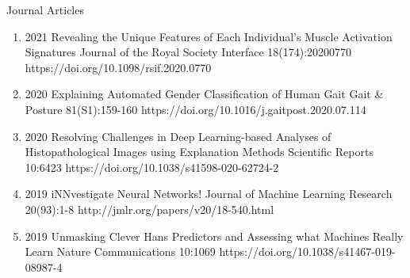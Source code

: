\documentclass[10pt,a4paper]{article} %
\begin{document}
\headedsection %
{Journal Articles}{ }
{
\begin{enumerate}

    \item[] 
                        {2021}
                        {Revealing the Unique Features of Each Individual's Muscle Activation Signatures}
                        {Journal of the Royal Society Interface}
                        {18(174):20200770}
                        {https://doi.org/10.1098/rsif.2020.0770}

    \item[] 
                        {2020}
                        {Explaining Automated Gender Classification of Human Gait}
                        {Gait \& Posture}
                        {81(S1):159-160}
                        {https://doi.org/10.1016/j.gaitpost.2020.07.114}

    \item[] 
                        {2020}
                        {Resolving Challenges in Deep Learning-based Analyses of Histopathological Images using Explanation Methods}
                        {Scientific Reports}
                        {10:6423}
                        {https://doi.org/10.1038/s41598-020-62724-2}

    \item[] 
                        {2019}
                        {iNNvestigate Neural Networks!}
                        {Journal of Machine Learning Research}
                        {20(93):1-8}
                        {http://jmlr.org/papers/v20/18-540.html}

    \item[] 
                        {2019}
                        {Unmasking Clever Hans Predictors and Assessing what Machines Really Learn}
                        {Nature Communications}
                        {10:1069}
                        {https://doi.org/10.1038/s41467-019-08987-4}


\end{enumerate}}
\end{document}
